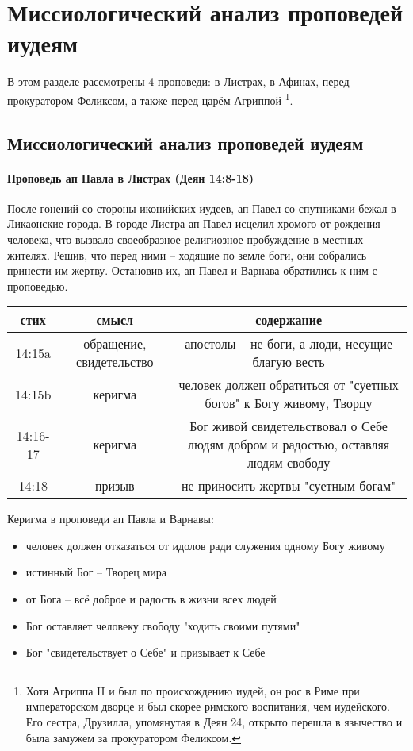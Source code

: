 \chapter{Миссиологический анализ проповедей иудеям}
\label{cha:hellenes}

В этом разделе рассмотрены 4 проповеди: в Листрах, в Афинах, перед прокуратором Феликсом, а также перед царём Агриппой \footnote{Хотя Агриппа II и был по происхождению иудей, он рос в Риме при императорском дворце и был скорее римского воспитания, чем иудейского. Его сестра, Друзилла, упомянутая в Деян 24, открыто перешла в язычество и была замужем за прокуратором Феликсом.}.

\section{Миссиологический анализ проповедей иудеям}
\subsubsection*{Проповедь ап Павла в Листрах (Деян 14:8-18)}
После гонений со стороны иконийских иудеев, ап Павел со спутниками бежал в Ликаонские города.
В городе Листра ап Павел исцелил хромого от рождения человека, что вызвало своеобразное религиозное пробуждение в местных жителях.
Решив, что перед ними – ходящие по земле боги, они собрались принести им жертву.
Остановив их, ап Павел и Варнава обратились к ним с проповедью.

\begin{center}
	\begin{tabular}{ |c|c|c| }
		\hline
		стих & смысл & содержание \\
		\hline\hline
		14:15a & обращение, свидетельство & апостолы – не боги, а люди, несущие благую весть \\
		14:15b & керигма & человек должен обратиться от "суетных богов" к Богу живому, Творцу \\
		14:16-17 & керигма & Бог живой свидетельствовал о Себе людям добром и радостью, оставляя людям свободу \\
		14:18 & призыв & не приносить жертвы "суетным богам" \\
		\hline
	\end{tabular}
\end{center}

Керигма в проповеди ап Павла и Варнавы:
\begin{itemize}
	\item человек должен отказаться от идолов ради служения одному Богу живому
	\item истинный Бог – Творец мира
	\item от Бога – всё доброе и радость в жизни всех людей
	\item Бог оставляет человеку свободу "ходить своими путями"
	\item Бог "свидетельствует о Себе" и призывает к Себе
\end{itemize}

